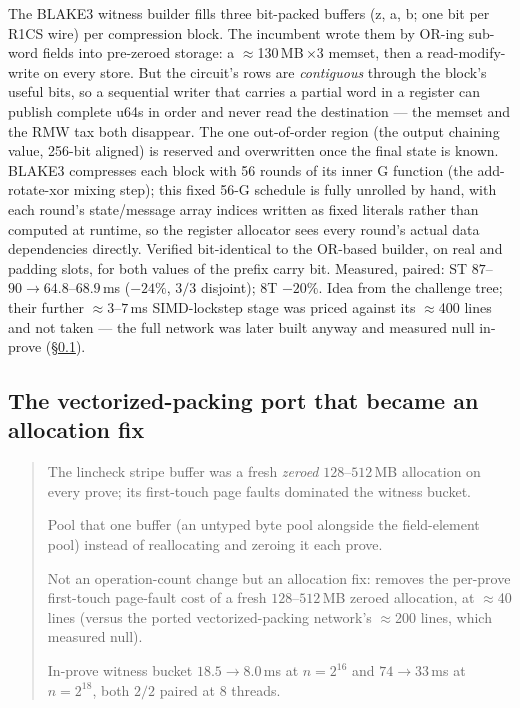 \documentclass[11pt]{article}
\newenvironment{optsummary}{%
  \begin{quote}\small
  \begin{description}
  \setlength{\itemsep}{1pt}\setlength{\parsep}{0pt}\setlength{\topsep}{2pt}
}{%
  \end{description}
  \end{quote}
}
\begin{document}
The BLAKE3 witness builder fills three bit-packed buffers (z, a, b; one bit
per R1CS wire) per compression block. The incumbent wrote them by OR-ing
sub-word fields into pre-zeroed storage: a $\approx$130\,MB\,$\times$3 memset,
then a read-modify-write on every store. But the circuit's rows are
\emph{contiguous} through the block's useful bits, so a sequential writer
that carries a partial word in a register can publish complete u64s in
order and never read the destination --- the memset and the RMW tax both
disappear. The one out-of-order region (the output chaining value, 256-bit
aligned) is reserved and overwritten once the final state is known. BLAKE3
compresses each block with 56 rounds of its inner G function (the
add-rotate-xor mixing step); this fixed 56-G schedule is fully unrolled
by hand, with each round's state/message array indices written as fixed
literals rather than computed at runtime, so the register allocator sees
every round's actual data dependencies directly. Verified bit-identical
to the OR-based builder, on real and padding slots, for both values of
the prefix carry bit.
Measured, paired: ST $87$--$90 \to 64.8$--$68.9\,$ms ($-24\%$, $3/3$
disjoint); 8T $-20\%$. Idea from the challenge tree; their further
$\approx$$3$--$7\,$ms SIMD-lockstep stage was priced against its
$\approx$400 lines and not taken --- the full network was later built
anyway and measured null in-prove (\S\ref{sec:zpool}).

\subsection{The vectorized-packing port that became an allocation fix}
\label{sec:zpool}

\begin{optsummary}
\item[Baseline:] The lincheck stripe buffer was a fresh \emph{zeroed} $128$--$512$\,MB allocation on every prove; its first-touch page faults dominated the witness bucket.
\item[Improvement:] Pool that one buffer (an untyped byte pool alongside the field-element pool) instead of reallocating and zeroing it each prove.
\item[Mechanism:] Not an operation-count change but an allocation fix: removes the per-prove first-touch page-fault cost of a fresh $128$--$512$\,MB zeroed allocation, at $\approx$40 lines (versus the ported vectorized-packing network's $\approx$200 lines, which measured null).
\item[Result:] In-prove witness bucket $18.5\to8.0\,$ms at $n=2^{16}$ and $74\to33\,$ms at $n=2^{18}$, both $2/2$ paired at 8 threads.
\end{optsummary}
\end{document}
